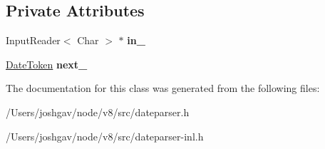 \subsection*{Private Attributes}
\begin{DoxyCompactItemize}
\item 
Input\+Reader$<$ Char $>$ $\ast$ {\bfseries in\+\_\+}\hypertarget{classv8_1_1internal_1_1_date_parser_1_1_date_string_tokenizer_aecfa74fb3e06b864a2e07ab554a0f15d}{}\label{classv8_1_1internal_1_1_date_parser_1_1_date_string_tokenizer_aecfa74fb3e06b864a2e07ab554a0f15d}

\item 
\hyperlink{structv8_1_1internal_1_1_date_parser_1_1_date_token}{Date\+Token} {\bfseries next\+\_\+}\hypertarget{classv8_1_1internal_1_1_date_parser_1_1_date_string_tokenizer_a9163a9e98420b76ab887ea427ff8dec8}{}\label{classv8_1_1internal_1_1_date_parser_1_1_date_string_tokenizer_a9163a9e98420b76ab887ea427ff8dec8}

\end{DoxyCompactItemize}


The documentation for this class was generated from the following files\+:\begin{DoxyCompactItemize}
\item 
/\+Users/joshgav/node/v8/src/dateparser.\+h\item 
/\+Users/joshgav/node/v8/src/dateparser-\/inl.\+h\end{DoxyCompactItemize}

